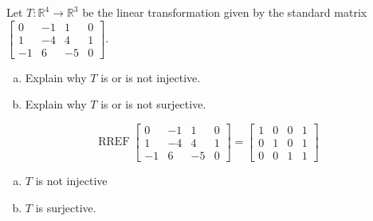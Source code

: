 
\begin{exerciseStatement}
 Let \(T:\mathbb{R}^ 4  \to \mathbb{R}^ 3 \) be the linear transformation given by the standard matrix \( \left[\begin{array}{cccc}
0 & -1 & 1 & 0 \\
1 & -4 & 4 & 1 \\
-1 & 6 & -5 & 0
\end{array}\right] .\)
\begin{enumerate}[(a)]
\item Explain why \(T\) is or is not injective.
\item Explain why \(T\) is or is not surjective.
\end{enumerate}
    
\end{exerciseStatement}
    
\begin{exerciseAnswer} 


\[\operatorname{RREF} \left[\begin{array}{cccc}
0 & -1 & 1 & 0 \\
1 & -4 & 4 & 1 \\
-1 & 6 & -5 & 0
\end{array}\right] = \left[\begin{array}{cccc}
1 & 0 & 0 & 1 \\
0 & 1 & 0 & 1 \\
0 & 0 & 1 & 1
\end{array}\right] \]


\begin{enumerate}[(a)]
\item \(T\) is not injective
\item \(T\) is surjective.
\end{enumerate}
    
\end{exerciseAnswer}
    
